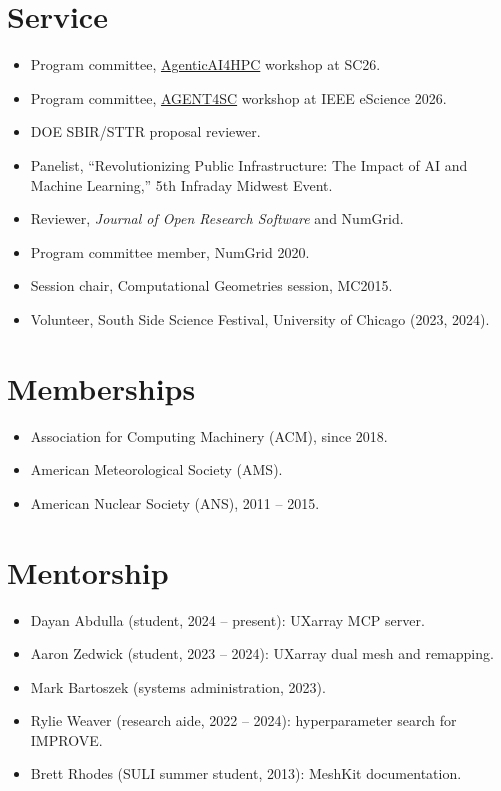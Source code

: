 \documentclass[10pt,letterpaper]{article}
\begin{document}
\section{Service}
\begin{itemize}
  \item Program committee, \href{https://ornl.github.io/events/agenticai4hpc2026/}{AgenticAI4HPC} workshop at SC26.
  \item Program committee, \href{https://agent4sc.github.io/}{AGENT4SC} workshop at IEEE eScience 2026.
  \item DOE SBIR/STTR proposal reviewer.
  \item Panelist, ``Revolutionizing Public Infrastructure: The Impact of AI and Machine Learning,'' 5th Infraday Midwest Event.
  \item Reviewer, \textit{Journal of Open Research Software} and NumGrid.
  \item Program committee member, NumGrid 2020.
  \item Session chair, Computational Geometries session, MC2015.
  \item Volunteer, South Side Science Festival, University of Chicago (2023, 2024).
\end{itemize}

\section{Memberships}
\begin{itemize}
  \item Association for Computing Machinery (ACM), since 2018.
  \item American Meteorological Society (AMS).
  \item American Nuclear Society (ANS), 2011 -- 2015.
\end{itemize}

\section{Mentorship}
\begin{itemize}
  \item Dayan Abdulla (student, 2024 -- present): UXarray MCP server.
  \item Aaron Zedwick (student, 2023 -- 2024): UXarray dual mesh and remapping.
  \item Mark Bartoszek (systems administration, 2023).
  \item Rylie Weaver (research aide, 2022 -- 2024): hyperparameter search for IMPROVE.
  \item Brett Rhodes (SULI summer student, 2013): MeshKit documentation.
\end{itemize}
\end{document}
